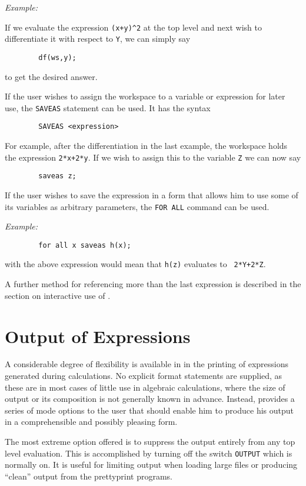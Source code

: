 {\it Example:}

If we evaluate the expression {\tt (x+y)\verb|^|2} at the top level and next
wish to differentiate it with respect to {\tt Y}, we can simply say
\begin{verbatim}
        df(ws,y);
\end{verbatim}
to get the desired answer.

\hypertarget{command:SAVEAS}{}
If the user wishes to assign the workspace to a variable or expression for
later use, the {\tt SAVEAS} statement can be used.  It
has the syntax
\begin{verbatim}
        SAVEAS <expression>
\end{verbatim}
For example, after the differentiation in the last example, the workspace
holds the expression {\tt 2*x+2*y}.  If we wish to assign this to the
variable {\tt Z} we can now say
\begin{verbatim}
        saveas z;
\end{verbatim}
If the user wishes to save the expression in a form that allows him to use
some of its variables as arbitrary parameters, the {\tt FOR ALL}
command can be used.

{\it Example:}
\begin{verbatim}
        for all x saveas h(x);
\end{verbatim}

with the above expression would mean that {\tt h(z)} evaluates to {\tt
2*Y+2*Z}.

A further method for referencing more than the last expression is described
in the section on interactive use of {\REDUCE}.


\section{Output of Expressions}

A considerable degree of flexibility is available in {\REDUCE} in the
printing of expressions generated during calculations.  No explicit format
statements are supplied, as these are in most cases of little use in
algebraic calculations, where the size of output or its composition is not
generally known in advance.  Instead, {\REDUCE} provides a series of mode
options to the user that should enable him to produce his output in a
comprehensible and possibly pleasing form.

\hypertarget{switch:OUTPUT}{}
The most extreme option offered is to suppress the output entirely from
any top level evaluation.  This is accomplished by turning off the switch
{\tt OUTPUT} which is normally on.  It is useful for
limiting output when loading large files or producing ``clean'' output from
the prettyprint programs.

